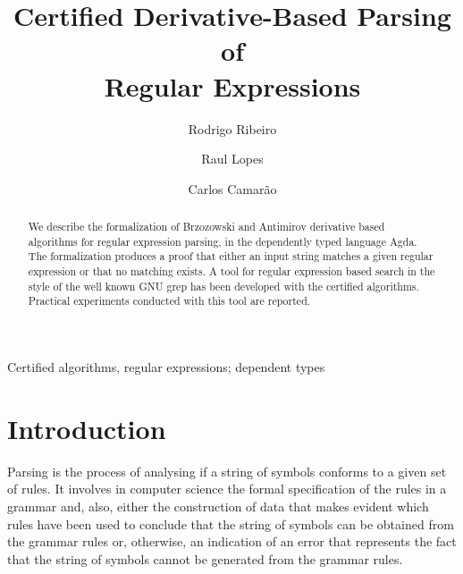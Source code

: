 \documentclass[review]{elsarticle}
\theoremstyle{definition}
\begin{document}
\begin{frontmatter}

\title{Certified Derivative-Based Parsing of\\ Regular Expressions}


\author[rgr]{Rodrigo Ribeiro}
\address{Dep. de Computa\c{c}\~ao, Universidade
Federal de Ouro Preto, ICEB, \newline Campus Universit\'ario Morro do
Cruzeiro, Ouro Preto, Minas Gerais, Brasil}

\author{Raul Lopes}
\address{Dep. de Computa\c{c}\~ao, Universidade
  Federal de Ouro Preto, ICEB, \newline Campus Universit\'ario Morro do
  Cruzeiro, Ouro Preto, Minas Gerais, Brasil}

\author{Carlos Camar\~ao}
\address{Dep. de Ci\^encia da Computa\c{c}\~ao, Universidade Federal
  de Minas Gerais, \newline Av. Ant\^onio Carlos 6627, Belo Horizonte, Minas Gerais, Brasil}

\begin{abstract}

We describe the formalization of Brzozowski and Antimirov derivative
based algorithms for regular expression parsing, in the dependently
typed language Agda. The formalization produces a proof that either an
input string matches a given regular expression or that no matching
exists. A tool for regular expression based search in the style of the
well known GNU grep has been developed with the certified algorithms.
Practical experiments conducted with this tool are reported.

\end{abstract}

\begin{keyword}
Certified algorithms, regular expressions; dependent types
\end{keyword}

\end{frontmatter}


\section{Introduction}\label{sec:intro}

Parsing is the process of analysing if a string of symbols conforms to
a given set of rules. It involves in computer science the formal
specification of the rules in a grammar and, also, either the
construction of data that makes evident which rules have been used to
conclude that the string of symbols can be obtained from the grammar
rules or, otherwise, an indication of an error that represents the
fact that the string of symbols cannot be generated from the grammar
rules.
\end{document}
